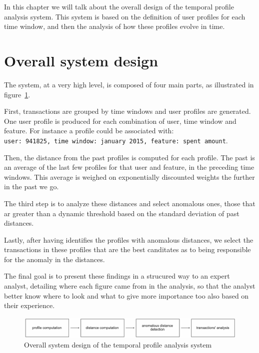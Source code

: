 
In this chapter we will talk about the overall design of the temporal profile analysis system. This system is based on the definition of user profiles for each time window, and then the analysis of how these profiles evolve in time.

\section{Overall system design}

The system, at a very high level, is composed of four main parts, as illustrated in figure~\ref{fig:system_design}.

First, transactions are grouped by time windows and user profiles are generated. One user profile is produced for each combination of user, time window and feature. For instance a profile could be associated with:\\ \texttt{user: 941825, time window: january 2015, feature: spent amount}.

Then, the distance from the past profiles is computed for each profile. The past is an average of the last few profiles for that user and feature, in the preceding time windows. This average is weighed on exponentially discounted weights the further in the past we go.

The third step is to analyze these distances and select anomalous ones, those that ar greater than a dynamic threshold based on the standard deviation of past distances.

Lastly, after having identifies the profiles with anomalous distances, we select the transactions in these profiles that are the best canditates as to being responsible for the anomaly in the distances.

The final goal is to present these findings in a strucured way to an expert analyst, detailing where each figure came from in the analysis, so that the analyst better know where to look and what to give more importance too also based on their experience.

\begin{figure}[h]
\centering
\includegraphics[width=450]{images/overall_system_design.pdf}
\caption{Overall system design of the temporal profile analysis system}
\label{fig:system_design}
\end{figure}

